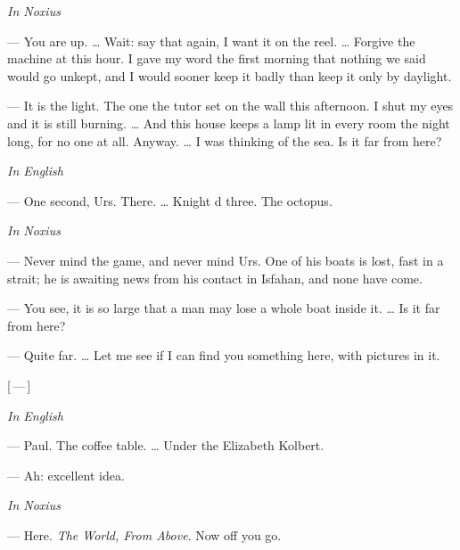 \begin{room}

\textit{In Noxius}

--- You are up. \ldots{} Wait: say that again, I want it on the reel. \ldots{} Forgive the machine at this hour. I gave my word the first morning that nothing we said would go unkept, and I would sooner keep it badly than keep it only by daylight.

--- It is the light. The one the tutor set on the wall this afternoon. I shut my eyes and it is still burning. \ldots{} And this house keeps a lamp lit in every room the night long, for no one at all. Anyway. \ldots{} I was thinking of the sea. Is it far from here?

\textit{In English}

--- One second, Urs. There. \ldots{} Knight d three. The octopus.

\textit{In Noxius}

--- Never mind the game, and never mind Urs. One of his boats is lost, fast in a strait; he is awaiting news from his contact in Isfahan, and none have come.

--- You see, it is so large that a man may lose a whole boat inside it. \ldots{} Is it far from here?

--- Quite far. \ldots{} Let me see if I can find you something here, with pictures in it.

\centerline{[\,---\,]}

\textit{In English}

--- Paul. The coffee table. \ldots{} Under the Elizabeth Kolbert.

--- Ah: excellent idea.

\textit{In Noxius}

--- Here. \textit{The World, From Above}. Now off you go.

\end{room}
